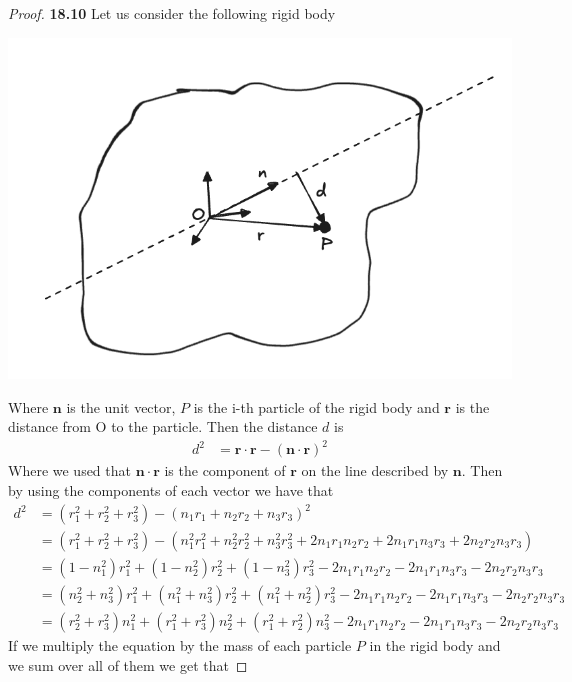 \documentclass[11pt]{article}
\theoremstyle{definition}
\begin{document}
\begin{proof}{\textbf{18.10}}
    Let us consider the following rigid body
    \begin{center}
        \includegraphics[scale=0.35]{ch18-10.png}
    \end{center}
    Where $\bm n$ is the unit vector, $P$ is the i-th particle of the rigid body
    and $\bm{r}$ is the distance from O to the particle. Then the distance
    $d$ is
    \begin{align*}
        d^2 &= \bm{r}\cdot\bm{r} - (\bm{n\cdot r})^2
    \end{align*} 
    Where we used that $\bm{n\cdot r}$ is the component of $\bm{r}$ on the line
    described by $\bm{n}$. Then by using the components of each vector
    we have that
    \begin{align*}
        d^2 &= (r_1^2 + r_2^2 + r_3^2) - (n_1r_1 + n_2r_2 + n_3r_3)^2\\
        &= (r_1^2 + r_2^2 + r_3^2) - (n_1^2r_1^2 + n_2^2r_2^2 + n_3^2r_3^2
        + 2n_1r_1n_2r_2 + 2n_1r_1n_3r_3 + 2n_2r_2n_3r_3)\\
        &= (1- n_1^2)r_1^2 + (1 - n_2^2)r_2^2 + (1 - n_3^2)r_3^2
        - 2n_1r_1n_2r_2 - 2n_1r_1n_3r_3 - 2n_2r_2n_3r_3\\
        &= (n_2^2 + n_3^2)r_1^2 + (n_1^2 + n_3^2)r_2^2 + (n_1^2 + n_2^2)r_3^2
        - 2n_1r_1n_2r_2 - 2n_1r_1n_3r_3 - 2n_2r_2n_3r_3\\
        &= (r_2^2 + r_3^2)n_1^2 + (r_1^2+ r_3^2)n_2^2 + (r_1^2 + r_2^2)n_3^2 
        - 2n_1r_1n_2r_2 - 2n_1r_1n_3r_3 - 2n_2r_2n_3r_3
    \end{align*}
    If we multiply the equation by the mass of each particle $P$ in the rigid
    body and we sum over all of them we get that

\end{proof}
\end{document}
